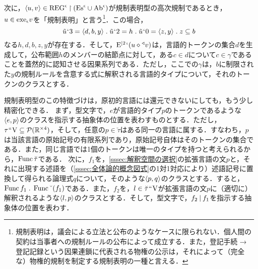 次に，$ \langle u,v \rangle\in\mathrm{REG}^\epsilon\mathbin{\upharpoonright}(\mathrm{Es}^\epsilon\cup\mathrm{Ab}^\epsilon) $が規制表明型の高次規制であるとき，$ u\in\mathrm{exe}_{\epsilon} v $を「規制表明」と言う\footnote{
    規制表明は，議会による立法と公布のようなケースに限られない．個人間の契約は当事者への規制ルールの公布によって成立する．また，登記手続 → 登記記録という因果連鎖に代表される物権の公示は，それによって（完全な）物権的規制を制定する規制表明の一種と言える．
}．この場合，
\[
    \tilde{u}\fap 3 = \orp{d,b,y}\con{1}\tilde{u}\fap 2 = h\con{1}
    \tilde{u}\fap 0=\orp{z,y}\con{1}z\subseteq b
\]
なる$ h,d,b,z,y $が存在する．そして，$ \mathrm{E}^{\mid 2}{\mspace{1mu}{`}\mspace{1mu}}(u\diamond{^\triangleleft}v) $は，言語的トークンの集合$d$を生成して，公布範囲$h$のメンバーの結節点に対して，ある$c\in d$について$c \in \gamma$であることを蓋然的に認知させる因果系列である．ただし，ここでの$\gamma$は，$b$に制限された$y$の規制ルールを含意する式に解釈される言語的タイプについて，それのトークンのクラスとする．

規制表明型のこの特徴づけは，原初的言語には還元できないにしても，もう少し精密化できる．
まず，型文字\kagi{$ \tau $}で，$e$が言語的タイプ$p$のトークンであるような$ \langle e,p \rangle $のクラスを指示する抽象体の位置を表わすものとする．ただし，$ \tau{\mspace{1mu}{``}\mspace{1mu}}\mathrm{V}\subseteq \mathcal{P}(\mathbb{R}^{\times 4}) $，そして，任意の$ p\in \breve{\tau} $はある同一の言語に属する．すなわち，$p$は当該言語の原始記号の有限系列であり，原始記号自体はそのトークンの集合である．また，同じ言語では1個のトークンは唯一のタイプを持つと考えられるから，$ \operatorname{Func}\breve{\tau} $である．
次に，$ f_1 $を，\ref{sssec:解釈空間の選択}の拡張言語の文$p$と，それに出現する述語を（\ref{sssec:全体論的概念図式}の1対1対応により）述語記号に置換して得られる論理式$q$について，そのような$\langle p,q \rangle$のクラスとする．すると，$ \func f_1\con{1}\func \brevel{(f_1)} $である．また，$ f_2 $を，$ l\in\breve{\tau}{\mspace{1mu}{``}\mspace{1mu}}\mathrm{V} $が拡張言語の文$p$に（適切に）解釈されるような$\langle l,p \rangle$のクラスとする．そして，型文字\kagi{$ \theta $}で，$ f_2\mathbin{\mid} f_1 $を指示する抽象体の位置を表わす．

